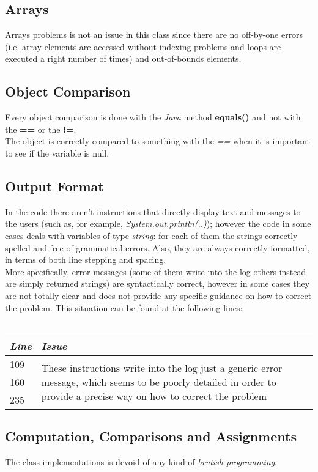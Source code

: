 \documentclass[11pt,a4paper]{report}
\begin{document}
\subsection{Arrays}
Arrays problems is not an issue in this class since there are no off-by-one errors (i.e. array elements are accessed without indexing problems and loops are executed a right number of times) and out-of-bounds elements.
\subsection{Object Comparison}
Every object comparison is done with the \textit{Java} method \textbf{equals()} and not with the \textbf{==} or the \textbf{!=}.\\The object is correctly compared to something with the \textit{==} when it is important to see if the variable is null.
\subsection{Output Format}
In the code there aren't instructions that directly display text and messages to the users (such as, for example, \textit{System.out.println(..)}); however the code in some cases deals with variables of type \textit{string}: for each of them the strings correctly spelled and free of grammatical errors. Also, they are always correctly formatted, in terms of both line stepping and spacing.\\
More specifically, error messages (some of them write into the log others instead are simply returned strings) are syntactically correct, however in some cases they are not totally clear and does not provide any specific guidance on how to correct the problem. This situation can be found at the following lines:\\
\\
\begin{tabularx}{\textwidth}{|l|X|}
	\hline
	\textit{Line} & \textit{Issue}\\
	\hline
	\hline
		109 & \multirow{3}{\linewidth}{These instructions write into the log just a generic error message, which seems to be poorly detailed in order to provide a precise way on how to correct the problem}\\
		160 & \\
		235 & \\
	\hline
\end{tabularx}

\subsection{Computation, Comparisons and Assignments}
The class implementations is devoid of any kind of \textit{brutish programming}.
\end{document}
